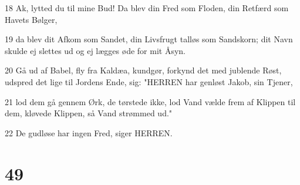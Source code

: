 \par 18 Ak, lytted du til mine Bud! Da blev din Fred som Floden, din Retfærd som Havets Bølger,
\par 19 da blev dit Afkom som Sandet, din Livsfrugt talløs som Sandskorn; dit Navn skulde ej slettes ud og ej lægges øde for mit Åsyn.
\par 20 Gå ud af Babel, fly fra Kaldæa, kundgør, forkynd det med jublende Røst, udspred det lige til Jordens Ende, sig: "HERREN har genløst Jakob, sin Tjener,
\par 21 lod dem gå gennem Ørk, de tørstede ikke, lod Vand vælde frem af Klippen til dem, kløvede Klippen, så Vand strømmed ud."
\par 22 De gudløse har ingen Fred, siger HERREN.

\chapter{49}

